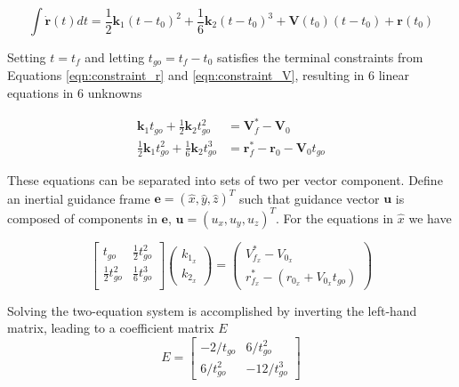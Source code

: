 \begin{equation}
\int \bm{\dot{r}}(t)dt = \frac{1}{2} \bm{k}_1(t-t_0)^2 + \frac{1}{6}\bm{k}_2(t-t_0)^3 + \bm{V}(t_0)(t-t_0) + \bm{r}(t_0) 
\label{eqn:EoM_solve_2}
\end{equation}

Setting $t = t_f$ and letting $t_{go} = t_f - t_0$ satisfies the terminal constraints from Equations \ref{eqn:constraint_r} and \ref{eqn:constraint_V}, resulting in 6 linear equations in 6 unknowns

\begin{align}
\label{eqn:system1}
\bm{k}_1 t_{go} + \frac{1}{2}\bm{k}_2 t_{go}^2 &= \bm{V}_f^* - \bm{V}_0\\
\label{eqn:system2}
\frac{1}{2}\bm{k}_1 t_{go}^2 + \frac{1}{6}\bm{k}_2 t_{go}^3 &= \bm{r}_f^* - \bm{r}_0 - \bm{V}_0t_{go}
\end{align}

These equations can be separated into sets of two per vector component. Define an inertial guidance frame $\bm{e} = (\hat{x},\hat{y},\hat{z})^T$ such that guidance vector $\bm{u}$ is composed of components in $\bm{e}$, $\bm{u} = (u_{x},u_{y},u_{z})^T$. For the equations in $\hat{x}$ we have

\begin{equation}
  \label{eqn:E_system}
  \begin{bmatrix}
    t_{go} & \frac{1}{2}t_{go}^2 \\
    \frac{1}{2}t_{go}^2 & \frac{1}{6}t_{go}^3 \\
  \end{bmatrix}
 \left(
	\begin{matrix}
	k_{1_x} \\ 
	k_{2_x} 
	\end{matrix}
\right) = 
 \left(
	\begin{matrix}
	V_{f_x}^* - V_{0_x} \\ 
	r_{f_x}^* - (r_{0_x} + V_{0_x}t_{go}) 
	\end{matrix}
\right)
\end{equation}

Solving the two-equation system is accomplished by inverting the left-hand matrix, leading to a coefficient matrix $E$
\begin{equation}
E = 
	\begin{bmatrix}
	-2/t_{go} & 6/t_{go}^2 \\
	6/t_{go}^2 & -12/t_{go}^3
	\end{bmatrix}
\end{equation}

